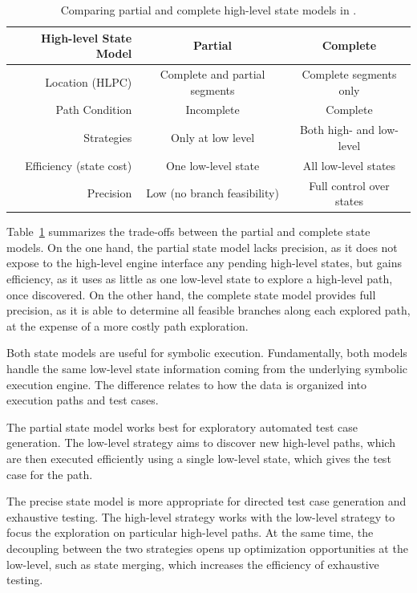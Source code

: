 \begin{table}
  \centering
  \small
  \begin{tabular}{r c c}
    High-level State Model & \textbf{Partial} & \textbf{Complete}               \\
    \hline
    \noalign{\smallskip}
    Location (HLPC) & Complete and partial segments & Complete segments only    \\
    Path Condition  & Incomplete                    & Complete                  \\
    Strategies      & Only at low level             & Both high- and low-level  \\
    \noalign{\smallskip}
    \hline
    \noalign{\smallskip}
    Efficiency (state cost) & \goodcolor One low-level state   & \badcolor All low-level states      \\
    Precision       & \badcolor Low (no branch feasibility)   & \goodcolor Full control over states  \\
  \end{tabular}
  \caption{Comparing partial and complete high-level state models in \chef.}
  \label{tab:chef:hl-states}
\end{table}

Table~\ref{tab:chef:hl-states} summarizes the trade-offs between the partial and complete state models.
%
On the one hand, the partial state model lacks precision, as it does not expose to the high-level engine interface any pending high-level states, but gains efficiency, as it uses as little as one low-level state to explore a high-level path, once discovered.
%
On the other hand, the complete state model provides full precision, as it is able to determine all feasible branches along each explored path, at the expense of a more costly path exploration.

Both state models are useful for symbolic execution.
%
Fundamentally, both models handle the same low-level state information coming from the underlying symbolic execution engine.  The difference relates to how the data is organized into execution paths and test cases.

The partial state model works best for exploratory automated test case generation.
%
The low-level strategy aims to discover new high-level paths, which are then executed efficiently using a single low-level state, which gives the test case for the path.

The precise state model is more appropriate for directed test case generation and exhaustive testing.
%
The high-level strategy works with the low-level strategy to focus the exploration on particular high-level paths.  At the same time, the decoupling between the two strategies opens up optimization opportunities at the low-level, such as state merging, which increases the efficiency of exhaustive testing.

